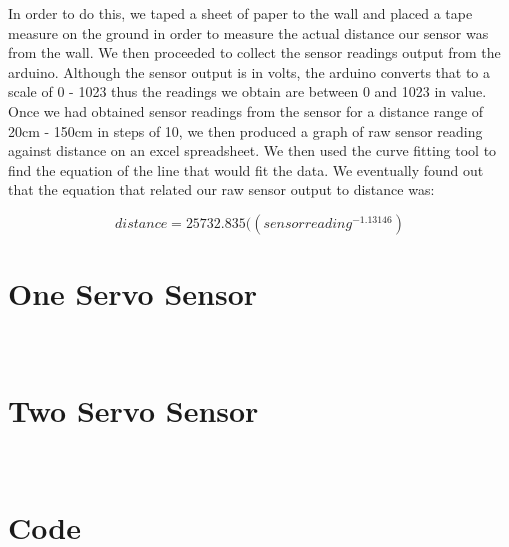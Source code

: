 \documentclass{article}
\begin{document}
In order to do this, we taped a sheet of paper to the wall and placed a tape measure on the ground in order to measure the actual distance our sensor was from the wall. We then proceeded to collect the sensor readings output from the arduino. Although the sensor output is in volts, the arduino converts that to a scale of 0 - 1023 thus the readings we obtain are between 0 and 1023 in value. \\

Once we had obtained sensor readings from the sensor for a distance range of 20cm - 150cm in steps of 10, we then produced a graph of raw sensor reading against distance on an excel spreadsheet. We then used the curve fitting tool to find the equation of the line that would fit the data. We eventually found out that the equation that related our raw sensor output to distance was:

\begin{equation}
distance=25732.835((sensor reading^{-1.13146})
\end{equation}

\section{One Servo Sensor} \ \\



\section{Two Servo Sensor} \ \\


\section{Code} \ \\
\end{document}
